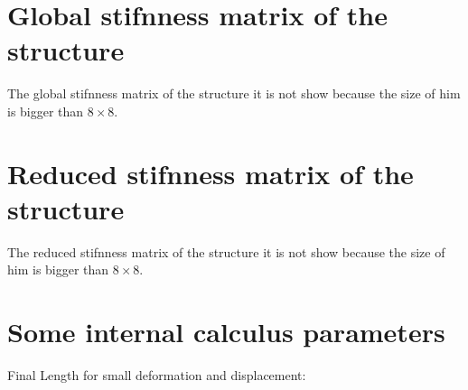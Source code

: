 \documentclass[a4paper,11pt]{article}
\begin{document}
\newpage                                     

\section{Global stifnness matrix of the structure}   

The global stifnness matrix of the structure it is not show because the size of him is bigger than $8\times8$.   

\section{Reduced stifnness matrix of the structure}   

The reduced stifnness matrix of the structure it is not show because the size of him is bigger than $8\times8$.   

\newpage       

\section{Some internal calculus parameters}       

Final Length for small deformation and displacement:
\end{document}
